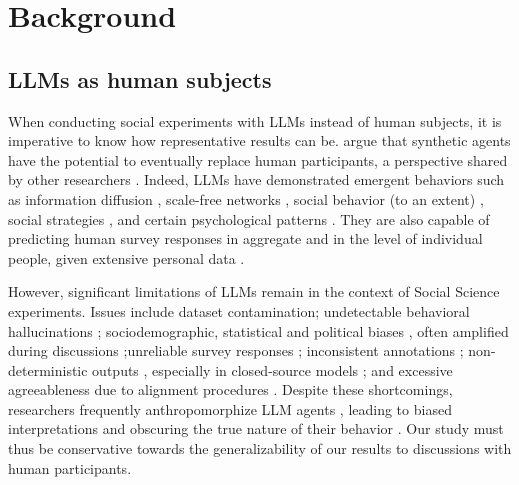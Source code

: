 %
\section{Background}

\subsection{LLMs as human subjects}
\label{ssec:related:human-llm}

When conducting social experiments with \acp{LLM} instead of human subjects, it is imperative to know how representative results can be. \citet{grossman_2023} argue that synthetic agents have the potential to eventually replace human participants, a perspective shared by other researchers \cite{tornberg_2023, argyle2023}. Indeed, \acp{LLM} have demonstrated emergent behaviors such as information diffusion \cite{Park2023GenerativeAI}, scale-free networks \cite{demarzo_2023}, social behavior (to an extent) \cite{leng_2024}, social strategies \cite{abdelnabi_negotiations}, and certain psychological patterns \cite{abramski_2023}. They are also capable of predicting human survey responses in aggregate \cite{hewitt2024predicting} and in the level of individual people, given extensive personal data \cite{park2024generativeagentsimulations1000}. %

However, significant limitations of \acp{LLM} remain in the context of Social Science experiments. Issues include dataset contamination; undetectable behavioral hallucinations \cite{rossi_2024}; sociodemographic, statistical and political biases \cite{anthis_2025,hewitt2024predicting,rossi_2024}, often amplified during discussions \cite{Taubenfeld2024SystematicBI};unreliable survey responses \cite{jansen_2023,bisbee_2023,neumann_2025}; inconsistent annotations \cite{Gligoric2024CanUL}; non-deterministic outputs \cite{atil_2025}, especially in closed-source models \cite{bisbee_2023}; and excessive agreeableness due to alignment procedures \cite{Park2023GenerativeAI, anthis_2025, rossi_2024}. Despite these shortcomings, researchers frequently anthropomorphize \ac{LLM} agents \cite{rossi_2024}, leading to biased interpretations and obscuring the true nature of their behavior \cite{anthis_2025,zhou-etal-2024-real}. Our study must thus be conservative towards the generalizability of our results to discussions with human participants.


